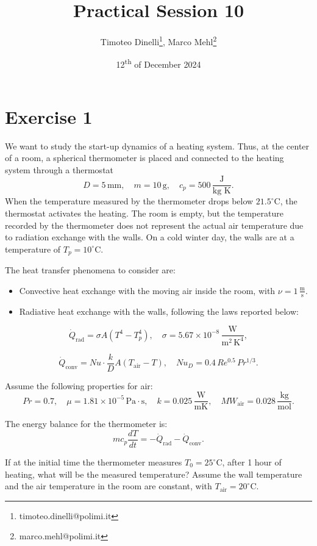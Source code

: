 \documentclass[oneside]{article}
\title{Practical Session 10}
\author{Timoteo Dinelli\footnote{timoteo.dinelli@polimi.it}, Marco Mehl\footnote{marco.mehl@polimi.it}}
\date{12\textsuperscript{th} of December 2024}
\begin{document}
\maketitle

\section*{Exercise 1}
We want to study the start-up dynamics of a heating system. Thus, at the center of a
room, a spherical thermometer is placed and connected to the heating system through a
thermostat 
\[
D = 5 \, \text{mm}, \quad m = 10 \, \text{g}, \quad c_p = 500 \, \frac{\text{J}}{\text{kg K}}.
\]
When the temperature measured by the thermometer drops below $21.5^\circ \text{C}$, the
thermostat activates the heating. The room is empty, but the temperature recorded by the
thermometer does not represent the actual air temperature due to radiation exchange with
the walls. On a cold winter day, the walls are at a temperature of $T_p = 10^\circ
\text{C}$.

The heat transfer phenomena to consider are:
\begin{itemize}
   \item Convective heat exchange with the moving air inside the room, with $\nu = 1 \,
      \frac{\text{m}}{\text{s}}$.
   \item Radiative heat exchange with the walls, following the laws reported below:
\end{itemize}

\[
\dot{Q}_\text{rad} = \sigma A \left( T^4 - T_p^4 \right), \quad \sigma = 5.67 \times 10^{-8} \, \frac{\text{W}}{\text{m}^2 \, \text{K}^4},
\]

\[
\dot{Q}_\text{conv} = Nu \cdot \frac{k}{D} A \left( T_\text{air} - T \right), \quad Nu_D = 0.4 \, Re^{0.5} \, Pr^{1/3}.
\]

Assume the following properties for air:
\[
Pr = 0.7, \quad \mu = 1.81 \times 10^{-5} \, \text{Pa} \cdot \text{s}, \quad k = 0.025 \,
\frac{\text{W}}{\text{mK}}, \quad MW_\text{air} = 0.028 \, \frac{\text{kg}}{\text{mol}}.
\]

The energy balance for the thermometer is:
\[
m c_p \frac{dT}{dt} = - \dot{Q}_\text{rad} - \dot{Q}_\text{conv}.
\]

If at the initial time the thermometer measures $T_0 = 25^\circ \text{C}$, after 1 hour
of heating, what will be the measured temperature? Assume the wall temperature and the
air temperature in the room are constant, with $T_\text{air} = 20^\circ \text{C}$.
\end{document}
